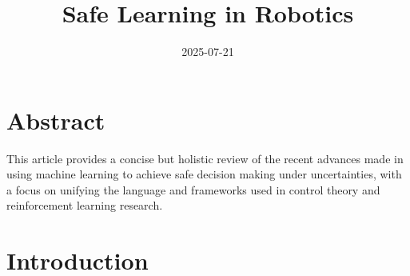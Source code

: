 \documentclass{article}
\title{Safe Learning in Robotics}
\date{2025-07-21}
\author{}
\begin{document}
\maketitle

\tableofcontents


\section*{Abstract}

This article provides a concise but holistic review of the recent advances made in using machine learning to achieve safe decision making under uncertainties, with a focus on unifying the language and frameworks used in control theory and reinforcement learning research.


\section{Introduction}
\end{document}
